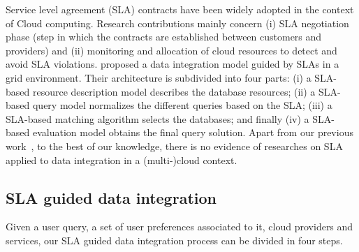 Service level agreement (SLA) contracts have been widely adopted in the context of Cloud computing. Research contributions mainly concern (i) SLA negotiation phase (step in which the contracts are established between customers and providers) and (ii) monitoring and allocation of cloud resources to detect and avoid SLA violations.
\cite{Nie07} proposed a data integration model guided by SLAs in a grid environment. Their architecture is subdivided into four parts: (i) a SLA-based resource description model describes the database resources; (ii) a SLA-based query model normalizes the different queries based on the SLA; (iii) a SLA-based matching algorithm selects the databases; and finally (iv) a SLA-based evaluation model obtains the final query solution.
Apart from our previous work~\cite{Bennani2014}, to the best of our knowledge, there is no evidence of researches on SLA applied to data integration in a (multi-)cloud context.

\subsection{SLA guided data integration}
%

Given a user query, a set of user preferences associated to it, cloud providers and services, our SLA guided data integration process can be divided in four steps.
\bigskip

